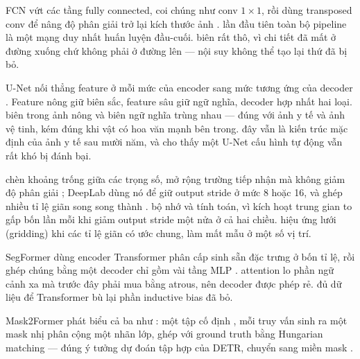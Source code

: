 \documentclass[../../../deep_learning.tex]{subfiles}
\begin{document}
\begin{mach}
\item {} \gp FCN vứt các tầng fully connected, coi chúng như conv \(1\times1\), rồi dùng transposed conv để nâng độ phân giải trở lại kích thước ảnh \cite{long2015fcn}. \hq lần đầu tiên toàn bộ pipeline là một mạng duy nhất huấn luyện đầu-cuối. \vdm biên rất thô, vì chi tiết đã mất ở đường xuống chứ không phải ở đường lên --- nội suy không thể tạo lại thứ đã bị bỏ.
\item {} \gp U-Net nối thẳng feature ở mỗi mức của encoder sang mức tương ứng của decoder \cite{ronneberger2015unet}. Feature nông giữ biên sắc, feature sâu giữ ngữ nghĩa, decoder hợp nhất hai loại. \gd biên trong ảnh nông và biên ngữ nghĩa trùng nhau --- đúng với ảnh y tế và ảnh vệ tinh, kém đúng khi vật có hoa văn mạnh bên trong. \hq đây vẫn là kiến trúc mặc định của ảnh y tế sau mười năm, và  cho thấy một U-Net cấu hình tự động vẫn rất khó bị đánh bại.
\item {} \gp {} chèn khoảng trống giữa các trọng số, mở rộng trường tiếp nhận mà không giảm độ phân giải \cite{yu2016dilated}; DeepLab dùng nó để giữ output stride ở mức 8 hoặc 16, và ghép nhiều tỉ lệ giãn song song thành  \cite{chen2018deeplab}. \gia bộ nhớ và tính toán, vì kích hoạt trung gian to gấp bốn lần mỗi khi giảm output stride một nửa ở cả hai chiều. \vdm hiệu ứng lưới (gridding) khi các tỉ lệ giãn có ước chung, làm mất mẫu ở một số vị trí.
\item {} \gp SegFormer dùng encoder Transformer phân cấp sinh sẵn đặc trưng ở bốn tỉ lệ, rồi ghép chúng bằng một decoder chỉ gồm vài tầng MLP \cite{xie2021segformer}. \hq attention lo phần ngữ cảnh xa mà trước đây phải mua bằng atrous, nên decoder được phép rẻ. \gd đủ dữ liệu để Transformer bù lại phần inductive bias đã bỏ.
\item {} \gp Mask2Former phát biểu cả ba như : một tập cố định , mỗi truy vấn sinh ra một mask nhị phân cộng một nhãn lớp, ghép với ground truth bằng Hungarian matching --- đúng ý tưởng dự đoán tập hợp của DETR, chuyển sang miền mask \cite{cheng2022mask2former, kirillov2019panoptic}. 

\end{mach}
\end{document}
